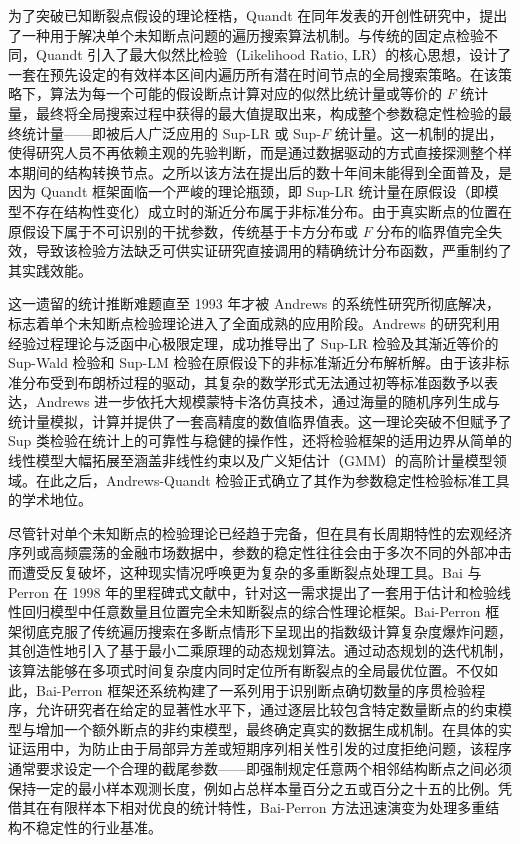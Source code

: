 \documentclass[UTF8,a4paper,12pt]{ctexbook}
\begin{document}
为了突破已知断裂点假设的理论桎梏，Quandt 在同年发表的开创性研究中，提出了一种用于解决单个未知断点问题的遍历搜索算法机制。与传统的固定点检验不同，Quandt 引入了最大似然比检验（Likelihood Ratio, LR）的核心思想，设计了一套在预先设定的有效样本区间内遍历所有潜在时间节点的全局搜索策略。在该策略下，算法为每一个可能的假设断点计算对应的似然比统计量或等价的 $F$ 统计量，最终将全局搜索过程中获得的最大值提取出来，构成整个参数稳定性检验的最终统计量——即被后人广泛应用的 Sup-LR 或 Sup-$F$ 统计量。这一机制的提出，使得研究人员不再依赖主观的先验判断，而是通过数据驱动的方式直接探测整个样本期间的结构转换节点。之所以该方法在提出后的数十年间未能得到全面普及，是因为 Quandt 框架面临一个严峻的理论瓶颈，即 Sup-LR 统计量在原假设（即模型不存在结构性变化）成立时的渐近分布属于非标准分布。由于真实断点的位置在原假设下属于不可识别的干扰参数，传统基于卡方分布或 $F$ 分布的临界值完全失效，导致该检验方法缺乏可供实证研究直接调用的精确统计分布函数，严重制约了其实践效能。

这一遗留的统计推断难题直至 1993 年才被 Andrews 的系统性研究所彻底解决，标志着单个未知断点检验理论进入了全面成熟的应用阶段。Andrews 的研究利用经验过程理论与泛函中心极限定理，成功推导出了 Sup-LR 检验及其渐近等价的 Sup-Wald 检验和 Sup-LM 检验在原假设下的非标准渐近分布解析解。由于该非标准分布受到布朗桥过程的驱动，其复杂的数学形式无法通过初等标准函数予以表达，Andrews 进一步依托大规模蒙特卡洛仿真技术，通过海量的随机序列生成与统计量模拟，计算并提供了一套高精度的数值临界值表。这一理论突破不但赋予了 Sup 类检验在统计上的可靠性与稳健的操作性，还将检验框架的适用边界从简单的线性模型大幅拓展至涵盖非线性约束以及广义矩估计（GMM）的高阶计量模型领域。在此之后，Andrews-Quandt 检验正式确立了其作为参数稳定性检验标准工具的学术地位。

尽管针对单个未知断点的检验理论已经趋于完备，但在具有长周期特性的宏观经济序列或高频震荡的金融市场数据中，参数的稳定性往往会由于多次不同的外部冲击而遭受反复破坏，这种现实情况呼唤更为复杂的多重断裂点处理工具。Bai 与 Perron 在 1998 年的里程碑式文献中，针对这一需求提出了一套用于估计和检验线性回归模型中任意数量且位置完全未知断裂点的综合性理论框架。Bai-Perron 框架彻底克服了传统遍历搜索在多断点情形下呈现出的指数级计算复杂度爆炸问题，其创造性地引入了基于最小二乘原理的动态规划算法。通过动态规划的迭代机制，该算法能够在多项式时间复杂度内同时定位所有断裂点的全局最优位置。不仅如此，Bai-Perron 框架还系统构建了一系列用于识别断点确切数量的序贯检验程序，允许研究者在给定的显著性水平下，通过逐层比较包含特定数量断点的约束模型与增加一个额外断点的非约束模型，最终确定真实的数据生成机制。在具体的实证运用中，为防止由于局部异方差或短期序列相关性引发的过度拒绝问题，该程序通常要求设定一个合理的截尾参数——即强制规定任意两个相邻结构断点之间必须保持一定的最小样本观测长度，例如占总样本量百分之五或百分之十五的比例。凭借其在有限样本下相对优良的统计特性，Bai-Perron 方法迅速演变为处理多重结构不稳定性的行业基准。
\end{document}
